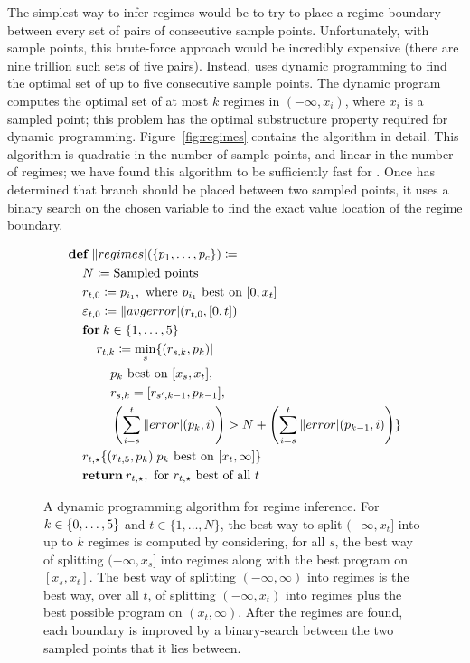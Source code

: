 \documentclass[paper.tex]{subfiles}
\begin{document}
The simplest way to infer regimes would be to try
  to place a regime boundary between every set
  of \nRegimes pairs of consecutive sample points.
Unfortunately, with \nSample sample points,
  this brute-force approach would be incredibly expensive
  (there are nine trillion such sets of five pairs).
Instead, \casio uses dynamic programming
  to find the optimal set of up to five consecutive sample points.
The dynamic program computes the optimal set
  of at most $k$ regimes in $(-\infty, x_i)$, where $x_i$ is a sampled point;
  this problem has the optimal substructure property
  required for dynamic programming.
Figure~\ref{fig:regimes} contains the algorithm in detail.
This algorithm is quadratic in the number of sample points,
  and linear in the number of regimes;
  we have found this algorithm to be sufficiently fast for \casio.
Once \casio has determined that branch should be placed
  between two sampled points,
  it uses a binary search on the chosen variable to 
  find the exact value location of the regime boundary.

\begin{figure}
\begin{footnotesize}
\begin{align*}
  &\!def!\:\|regimes|(\{p_1, \dotsc, p_c\}) \ceq \\
  &\> N \ceq \text{Sampled points} \\
  &\> r_{t,0} \ceq p_{i_1}, \text{ where } p_{i_1} \text{ best on } [0, x_t] \\
  &\> \varepsilon_{t,0} \ceq \|avgerror|(r_{t,0}, [0, t]) \\
  &\> \!for!\:k \in \{1, \dotsc, \nRegimes \} \\
  &\> \> r_{t,k} \ceq \min_s \{ (r_{s,k}, p_k) | \\
  &\> \> \> p_k \text{ best on } [x_s, x_t], \\
  &\> \> \> r_{s,k} = [r_{s',k-1}, p_{k-1}], \\
  &\> \> \> \left(\sum_{i = s}^t \|error|(p_k, i)\right) >
  N + \left(\sum_{i = s}^t \|error|(p_{k - 1}, i)\right) \} \\
  &\> r_{t,\star} \{ (r_{t,\nRegimes}, p_k) | p_k \text{ best on } [x_t, \infty] \} \\
  &\> \!return!\:r_{t,\star}, \text{ for } r_{t, \star} \text{ best of all } t
\end{align*}
\end{footnotesize}
\caption{A dynamic programming algorithm for regime inference.
  For $k \in \{0,\dotsc,5\}$ and $t \in \{1, \dotsc, N\}$,
    the best way to split $(-\infty, x_t]$ into up to $k$ regimes is computed
    by considering, for all $s$,
    the best way of splitting $(-\infty, x_s]$ into regimes
    along with the best program on $[x_s, x_t]$.
  The best way of splitting $(-\infty, \infty)$ into regimes
    is the best way, over all $t$, of splitting $(-\infty, x_t)$ into regimes
    plus the best possible program on $(x_t, \infty)$.
  After the regimes are found,
    each boundary is improved by a binary-search
    between the two sampled points that it lies between.}
\label{alg:main}
\end{figure}
\end{document}
